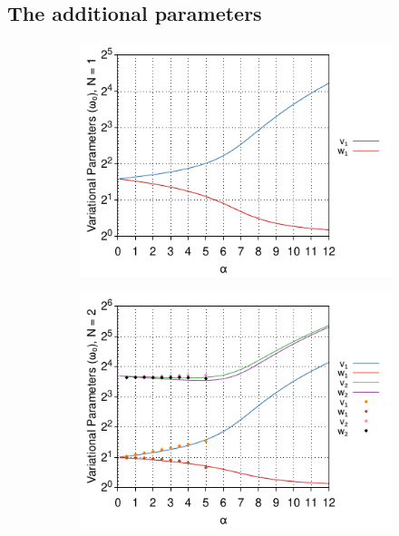 \subsection{The additional parameters}

\begin{figure}[!tbp]
    \centering
  \begin{subfigure}[b]{0.49\textwidth}
    \centering
    \includegraphics[width=\textwidth]{figures/frohlich-3d-multivariate-vw-alpha-0to12-beta-inf-N-1-COLOUR.pdf}
  \end{subfigure}
  \begin{subfigure}[b]{0.49\textwidth}
    \centering
    \includegraphics[width=\textwidth]{figures/frohlich-3d-multivariate-vw-alpha-0to12-beta-inf-N-2-COLOUR.pdf}

\end{subfigure}
\end{figure}
